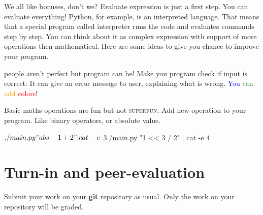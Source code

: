 \documentclass{42-en}
\begin{document}
    We all like bonuses, don't we? Evaluate expression is just a first step.
    You can evaluate everything! Python, for example, is an interpreted language.
    That means that a special program called interpreter runs the code and evaluates
    commands step by step. You can think about it as complex expression with support
    of more operations then mathematical. Here are some ideas to give you chance
    to improve your program.
     \begin{description}\itemsep3pt
        \item [Errors:] people aren't perfect but program can be! Make you program check if
        input is correct. It can give an error message to user, explaining what is wrong.
        \textcolor{blue}{You} \textcolor{green}{can} \textcolor{orange}{add} \textcolor{red}{colors}!
        \item [More operations:] Basic maths operations are fun but not \textsc{superfun}.
        Add new operation to your program. Like binary operators, or absolute value.\\
        \begin{42console}
$./main.py "abs -1 + 2" | cat -e
$ 3$
$./main.py "1 << 3 / 2" | cat -e
$ 4$\end{42console}
    \end{description}
    

\chapter{Turn-in and peer-evaluation}

    Submit your work on your \textbf{git} repository as usual. Only the work on your repository
will be graded.

\end{document}
